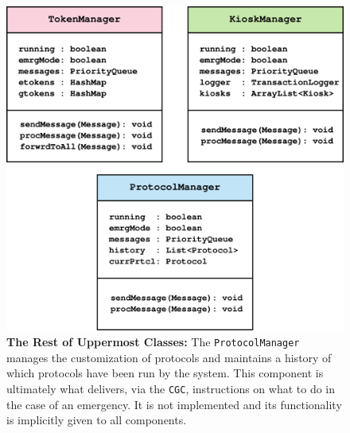 \documentclass[12pt]{article}
\begin{document}
\begin{figure}[H]
    \centerline{\includegraphics[scale=0.8]{MainClasses2.png}}
    \caption{\textbf{The Rest of Uppermost Classes:} The \texttt{ProtocolManager} manages the customization of protocols and maintains
    a history of which protocols have been run by the system. This component is ultimately what delivers, via the \texttt{CGC}, instructions
    on what to do in the case of an emergency. It is not implemented and its functionality is implicitly given to all components.}
    \label{fig:mainclasses2}
\end{figure}
\end{document}
